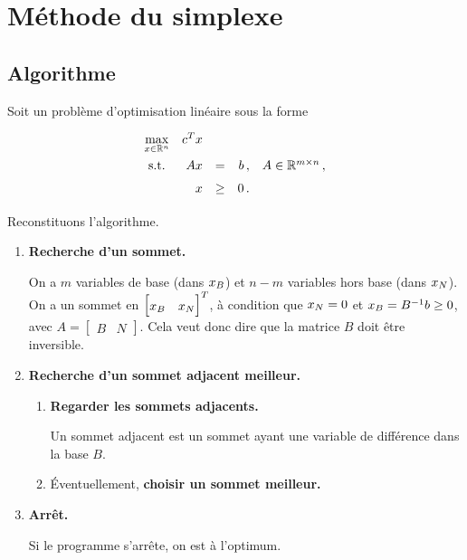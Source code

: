 \section{Méthode du simplexe}

\subsection{Algorithme}

Soit un problème d'optimisation linéaire sous la forme
\[
\renewcommand{\arraystretch}{1.5}
\begin{array}{c@{\quad}rcr@{\quad}l}
	\max\limits_{x \in \Rn} & c^T x &     &      &                       \\
	\textnormal{s.t.}       &   A x & =   & b\,, & A \in \R^{m \times n}\,, \\
	                        &     x & \ge & 0\,. &                       \\
\end{array}
\]

Reconstituons l'algorithme.

\begin{enumerate}
	\item \textbf{Recherche d'un sommet.}

	On a $m$ variables de base (dans $x_B$)
	et $n-m$ variables hors base (dans $x_N$).
	On a un sommet en $\begin{bmatrix} \xb & \xn \end{bmatrix}^T$,
	à condition que $x_N = 0$ et $x_B = B^{-1} b \ge 0$,
	avec $A = \begin{bmatrix} B & N \end{bmatrix}$.
	Cela veut donc dire que la matrice $B$ doit être inversible.
	\item \textbf{Recherche d'un sommet adjacent meilleur.}
	\begin{enumerate}
		\item \textbf{Regarder les sommets adjacents.}

		Un sommet adjacent est un sommet ayant
		une variable de différence dans la base $B$.
		\item Éventuellement, \textbf{choisir un sommet meilleur.}
	\end{enumerate}
	\item \textbf{Arrêt.}

	Si le programme s'arrête, on est à l'optimum.
\end{enumerate}

